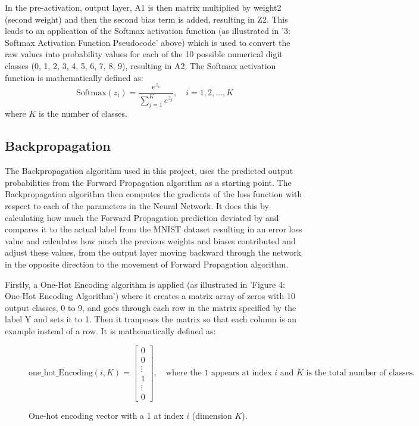 \documentclass[11pt]{article}
\begin{document}
\vspace{1em}
In the pre-activation, output layer, A1 is then matrix multiplied by weight2 (second weight) and then the second bias term is added, resulting in Z2. This leads to an application of the Softmax activation function (as illustrated in '3: Softmax Activation Function Pseudocode' above) which is used to convert the raw values into probability values for each of the 10 possible numerical digit classes (0, 1, 2, 3, 4, 5, 6, 7, 8, 9), resulting in A2. The Softmax activation function is mathematically defined as:
\begin{equation}
\text{Softmax}(z_i) = \frac{e^{z_i}}{\sum_{j=1}^{K} e^{z_j}}, \quad i = 1, 2, \ldots, K
\end{equation}
where $K$ is the number of classes.

\subsection{Backpropagation}
The Backpropagation algorithm used in this project, uses the predicted output probabilities from the Forward Propagation algorithm as a starting point. The Backpropagation algorithm then computes the gradients of the loss function with respect to each of the parameters in the Neural Network. It does this by calculating how much the Forward Propagation prediction deviated by and compares it to the actual label from the MNIST dataset resulting in an error loss value and calculates how much the previous weights and biases contributed and adjust these values, from the output layer moving backward through the network in the opposite direction to the movement of Forward Propagation algorithm.

\vspace{1em}
Firstly, a One-Hot Encoding algorithm is applied (as illustrated in 'Figure 4: One-Hot Encoding Algorithm') where it creates a matrix array of zeros with 10 output classes, 0 to 9, and goes through each row in the matrix specified by the label Y and sets it to 1. Then it tranposes the matrix so that each column is an example instead of a row. It is mathematically defined as:
\begin{figure}[ht]
\centering
$$\mathrm{one\_hot\_Encoding}(i, K) = \begin{bmatrix} 0 \\ 0 \\ \vdots \\ 1 \\ \vdots \\ 0 \end{bmatrix}, \quad \text{where the $1$ appears at index $i$ and $K$ is the total number of classes.}$$
\caption{One-hot encoding vector with a 1 at index $i$ (dimension $K$).}
\label{fig:onehot}
\end{figure}
\end{document}
